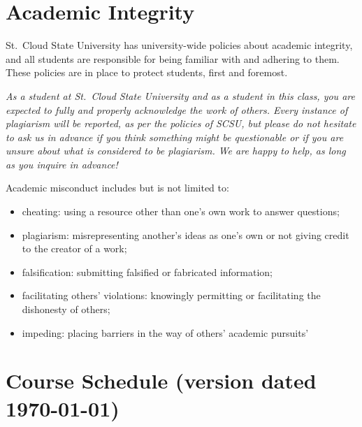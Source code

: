 \documentclass{tufte-handout}
\begin{document}
\begin{fullwidth}
\section{Academic Integrity}



{St.\ Cloud State University has university-wide policies about academic integrity, and all students are responsible for being familiar with and adhering to them. These policies are in place to protect students, first and foremost. }



\emph{As a student at St.\ Cloud State University and as a student in this class, you are expected to fully and properly acknowledge the work of others. Every instance of plagiarism will be reported, as per the policies of SCSU, but please do not hesitate to ask us in advance if you think something might be questionable or if you are unsure about what is considered to be plagiarism. We are happy to help, as long as you inquire in advance! }

Academic misconduct includes but is not limited to:

\begin{itemize}
	\item cheating: using a resource other than one's own work to answer questions;
	\item plagiarism: misrepresenting another's ideas as one's own or not giving credit to the creator of a work;
	\item falsification: submitting falsified or fabricated information;
	\item facilitating others' violations: knowingly permitting or facilitating the dishonesty of others;
	\item impeding: placing barriers in the way of others' academic pursuits'
\end{itemize}





\newpage

\section{Course Schedule (version dated \today)}


\end{fullwidth}
\end{document}
